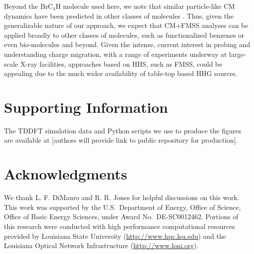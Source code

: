 \documentclass[journal=jacsat,manuscript=article]{achemso}
\begin{document}
Beyond the $\text{BrC}_{4}\text{H}$ molecule used here, we note that similar particle-like CM dynamics have been predicted in other classes of molecules \cite{folorunso2021, folorunso2023}. Thus, given the generalizable nature of our approach, we expect that CM+FMSS analyses can be applied broadly to other classes of molecules, such as functionalized benzenes or even bio-molecules and beyond. Given the intense, current interest in probing and understanding charge migration, with a range of experiments underway at large-scale X-ray facilities\cite{li2022, grell2023}, approaches based on HHS, such as FMSS, could be appealing due to the much wider availability of table-top based HHG sources.

\section{Supporting Information}

The TDDFT simulation data and Python scripts we use to produce the figures are available at [authors will provide link to public repository for production].

\section{Acknowledgments}

We thank L. F. DiMauro and R. R. Jones for helpful discussions on this work.
%
This work was supported by the U.S.\ Department of Energy, Office of Science, Office of Basic Energy Sciences, under Award No.~DE-SC0012462.
%
Portions of this research were conducted with high performance computational resources provided by Louisiana State University (\url{http://www.hpc.lsu.edu}) and the Louisiana Optical Network Infrastructure (\url{http://www.loni.org}).

\singlespacing
\end{document}
